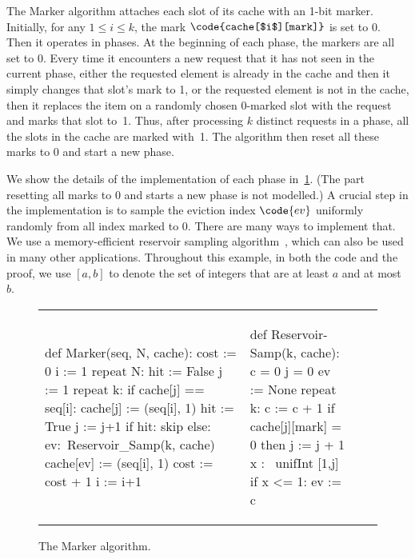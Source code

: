 The Marker algorithm attaches each slot of its cache with an 1-bit marker.
Initially, for any $1 \leq i \leq k$, the mark
$\code{cache[$i$][mark]}$ is set to 0.
Then it operates in phases.
At the beginning of each phase, the markers are all set to 0.
Every time it encounters a new request that
it has not seen in the current phase,
either the requested element is already in the cache and then
it simply changes that slot's mark to 1,
or the requested element is not in the cache,
then it replaces the item on a randomly chosen 0-marked slot with the request
and marks that slot to~1.
Thus, after processing $k$ distinct requests in a phase,
all the slots in the cache are marked with~1.
 The algorithm then reset all
these marks to 0 and start a new phase.

We show the details of the implementation of each phase in~\cref{fig:marker:algorithm}.
(The part resetting all marks to 0 and starts a new phase is not modelled.)
A crucial step in the implementation is to sample the eviction index $\code{ev}$
uniformly randomly from all index marked to 0.
There are many ways to implement that. We use a memory-efficient reservoir sampling algorithm~\cite{vitter1985random}, which can also be used in many other applications.
Throughout this example, in both the code and the proof, we use $[a, b]$ to denote the set of integers
that are at least $a$ and at most $b$.

\begin{figure}
\setlength\tabcolsep{0pt}\begin{tabular*}{\textwidth}{
    @{\extracolsep{\fill}}
    *{4}{p{}}@{}
  }
  \begin{sourcecode*}
  def Marker(seq, N, cache):
    cost := 0
    i := 1
    repeat N:
       hit := False
       j := 1
       repeat k:
	       if cache[j]  == seq[i]:
		        cache[j] := (seq[i], 1)
		        hit := True
	       j := j+1
	    if hit:
		    skip
		  else:
        ev:~Reservoir_Samp(k, cache)
		  	cache[ev] := (seq[i], 1)
		    cost := cost + 1
      i := i+1
  \end{sourcecode*}
  &
  \begin{sourcecode*}
    def Reservoir-Samp(k, cache):
        c = 0
        j = 0
        ev := None
        repeat k:
          c := c + 1
          if cache[j][mark] = 0 then
            j := j + 1
            x :~ unifInt [1,j]
            if x <= 1:
              ev := c
  \end{sourcecode*}
\end{tabular*}
  \caption{The Marker algorithm.}
  \label{fig:marker:algorithm}
\end{figure}


